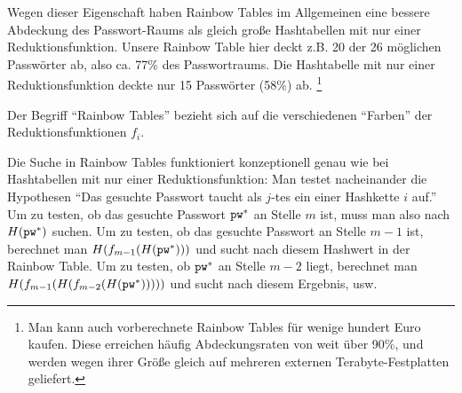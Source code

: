 Wegen dieser Eigenschaft haben Rainbow Tables im Allgemeinen eine
bessere Abdeckung des Passwort-Raums als gleich große Hashtabellen mit
nur einer Reduktionsfunktion. Unsere Rainbow Table hier deckt z.B. 20
der 26 möglichen Passwörter ab, also ca. 77\% des Passwortraums. Die
Hashtabelle mit nur einer Reduktionsfunktion deckte nur 15 Passwörter
(58\%) ab. \footnote{Man kann auch vorberechnete Rainbow Tables für
wenige hundert Euro kaufen. Diese erreichen häufig Abdeckungsraten von
weit über 90\%, und werden wegen ihrer Größe gleich auf mehreren
externen Terabyte-Festplatten geliefert. %
}

Der Begriff "`Rainbow Tables"' bezieht sich auf die verschiedenen
"`Farben"' der Reduktionsfunktionen $f_i$.

Die Suche in Rainbow Tables funktioniert konzeptionell genau wie bei
Hashtabellen mit nur einer Reduktionsfunktion: Man testet nacheinander
die Hypothesen "`Das gesuchte Passwort taucht als $j$-tes ein einer
Hashkette $i$ auf."' Um zu testen, ob das gesuchte Passwort $\texttt{pw}^*$ an
Stelle $m$ ist, muss man also nach $H(\texttt{pw}^*)$ suchen. Um zu testen, ob
das gesuchte Passwort an Stelle $m-1$ ist, berechnet man
$H(f_{m-1}(H(\texttt{pw}^*)))$ und sucht nach diesem Hashwert in der Rainbow
Table. Um zu testen, ob $\texttt{pw}^*$ an Stelle $m-2$ liegt, berechnet man
$H(f_{m-1}(H(f_{m-2}(H(\texttt{pw}^*)))))$ und sucht nach diesem Ergebnis,
usw.

